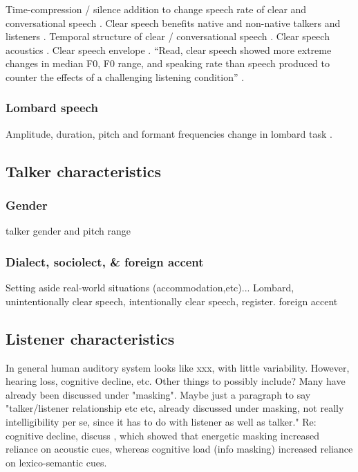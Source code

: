 Time-compression / silence addition to change speech rate of clear and conversational speech \citep{LiuZeng2006}.  
Clear speech benefits native and non-native talkers and listeners \citep{SmiljanicBradlow2011}.  
Temporal structure of clear / conversational speech \citep{SmiljanicBradlow2008}.  
Clear speech acoustics \citep{KrauseBraida2004}.  
Clear speech envelope \citep{KrauseBraida2009}.  
“Read, clear speech showed more extreme changes in median F0, F0 range, and speaking rate than speech produced to counter the effects of a challenging listening condition” \citep{HazanBaker2011}.

\subsubsection{Lombard speech}
Amplitude, duration, pitch and formant frequencies change in lombard task \citep{SummersEtAl1988}.

\subsection{Talker characteristics}

\subsubsection{Gender}
talker gender and pitch range \citep[\eg][]{BradlowEtAl1996}

\subsubsection{Dialect, sociolect, \& foreign accent}
Setting aside real-world situations (accommodation,etc)...  Lombard, unintentionally clear speech, intentionally clear speech, register.  foreign accent \citep{SmiljanicBradlow2011}

\subsection{Listener characteristics}
In general human auditory system looks like xxx, with little variability.  However, hearing loss, cognitive decline, etc.  Other things to possibly include?  Many have already been discussed under "masking".  Maybe just a paragraph to say "talker/listener relationship etc etc, already discussed under masking, not really intelligibility per se, since it has to do with listener as well as talker."  Re: cognitive decline, discuss \citep{MattysEtAl2009}, which showed that energetic masking increased reliance on acoustic cues, whereas cognitive load (info masking) increased reliance on lexico-semantic cues. 

